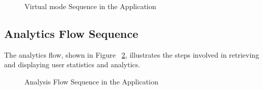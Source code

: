 \begin{figure}[ht!]
    \centering
    
    \caption{Virtual mode Sequence in the Application}
    \label{fig:virtual_mode_flow}
\end{figure}


\subsection{Analytics Flow Sequence}

The analytics flow, shown in Figure ~\ref{fig:analysis_flow}, illustrates the steps involved in retrieving and displaying user statistics and analytics.

\begin{figure}[ht!]
    \centering
    
    \caption{Analysis Flow Sequence in the Application}
    \label{fig:analysis_flow}
\end{figure}


